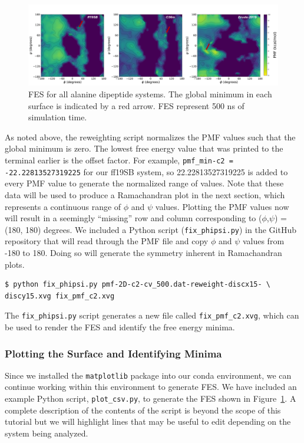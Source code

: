 \documentclass[9pt,tutorial,pubversion]{livecoms}
\begin{document}
\begin{figure}[t]
    \includegraphics[scale=0.68]{main_figs/alad_allfes_500.png}
    \caption{FES for all alanine dipeptide systems. The global minimum in each surface is indicated by a red arrow. FES represent 500 ns of simulation time.}
    \label{fig:alad_allffs}
\end{figure}

As noted above, the reweighting script normalizes the PMF values such that the global minimum is zero. The lowest free energy value that was printed to the terminal earlier is the offset factor. For example, \texttt{pmf\_min-c2 = -22.22813527319225} for our ff19SB system, so 22.22813527319225 is added to every PMF value to generate the normalized range of values. Note that these data will be used to produce a Ramachandran plot in the next section, which represents a continuous range of $\phi$ and $\psi$ values. Plotting the PMF values now will result in a seemingly ``missing'' row and column corresponding to ($\phi$,$\psi$) = (180, 180) degrees. We included a Python script (\texttt{fix\_phipsi.py}) in the GitHub repository that will read through the PMF file and copy $\phi$ and $\psi$ values from -180 to 180. Doing so will generate the symmetry inherent in Ramachandran plots. 

\begin{lstlisting}[style=MyBash]
$ python fix_phipsi.py pmf-2D-c2-cv_500.dat-reweight-discx15- \
discy15.xvg fix_pmf_c2.xvg
\end{lstlisting}

The \texttt{fix\_phipsi.py} script generates a new file called \texttt{fix\_pmf\_c2.xvg}, which can be used to render the FES and identify the free energy minima. 

\subsubsection{Plotting the Surface and Identifying Minima}
Since we installed the \texttt{matplotlib} package into our conda environment, we can continue working within this environment to generate FES. We have included an example Python script, \texttt{plot\_csv.py}, to generate the FES shown in Figure~\ref{fig:alad_allffs}. A complete description of the contents of the script is beyond the scope of this tutorial but we will highlight lines that may be useful to edit depending on the system being analyzed. 
\end{document}
